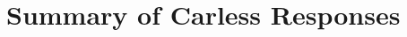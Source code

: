 \documentclass[6pt]{article}
\begin{document}
\section{Summary of Carless Responses}
\end{document}
